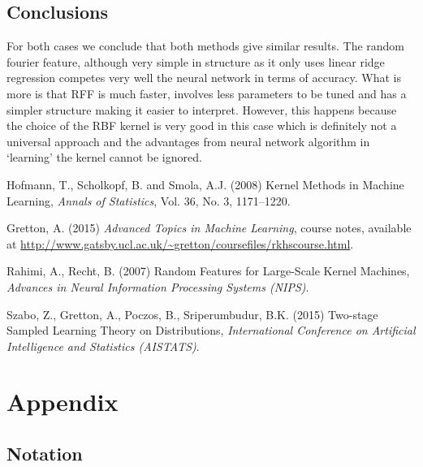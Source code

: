 \documentclass{article} %
\begin{document}
\subsection{Conclusions}
For both cases we conclude that both methods give similar results. The random fourier feature, although very simple in structure as it only uses linear ridge regression competes very well the neural network in terms of accuracy. What is more is that RFF is much faster,  involves less parameters to be tuned and has a simpler structure making it easier to interpret. However, this happens because the choice of the RBF kernel is very good in this case which is definitely not a universal approach and the advantages from neural network algorithm in `learning' the kernel cannot be ignored.

\begin{thebibliography}{20}
	Hofmann, T., Scholkopf, B. and Smola, A.J.
	(2008)
	Kernel Methods in Machine Learning,
	\textit{Annals of Statistics}, Vol. 36, No. 3, 1171–1220.
	
	
	Gretton, A.
	(2015)
	\textit{Advanced Topics in Machine Learning}, course notes, available at \url{http://www.gatsby.ucl.ac.uk/~gretton/coursefiles/rkhscourse.html}.
	
	Rahimi, A., Recht, B.
	(2007)
	Random Features for Large-Scale Kernel Machines,
	\textit{Advances in Neural Information Processing Systems (NIPS)}.
	
	Szabo, Z., Gretton, A., Poczos, B., Sriperumbudur, B.K.
	(2015)
	Two-stage Sampled Learning Theory on Distributions,
	\textit{International Conference on Artificial Intelligence and Statistics (AISTATS)}.
	
\end{thebibliography}

\section{Appendix}

\subsection{Notation}
\end{document}
